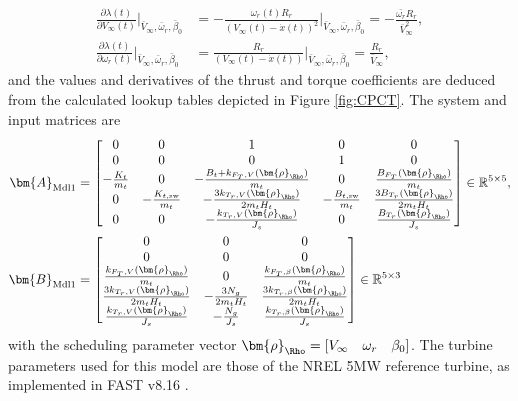 \begin{align*}
\frac{ \partial \lambda(t)}{\partial V_{\infty}(t)}\bigg|_{\bar{V}_{\infty},\bar{\omega}_r,\bar{\beta}_0} &= - \frac{\omega_r(t) R_r}{(V_{\infty}(t)-\dot{x}(t))^2}\bigg|_{\bar{V}_{\infty},\bar{\omega}_r,\bar{\beta}_0} = - \frac{\bar{\omega_r}R_r}{\bar{V}_{\infty}^2},\\
\frac{ \partial \lambda(t)}{\partial \omega_{r}(t)}\bigg|_{\bar{V}_{\infty},\bar{\omega}_r,\bar{\beta}_0} &=  \frac{ R_r}{(V_{\infty}(t)-\dot{x}(t))}\bigg|_{\bar{V}_{\infty},\bar{\omega}_r,\bar{\beta}_0} = \frac{R_r}{\bar{V}_{\infty}},
\end{align*}
and the values and derivatives of the thrust and torque coefficients are deduced from the calculated lookup tables depicted in Figure \ref{fig:CPCT}.
The system and input matrices are
\begin{align*}
\bm{A}_{\text{Mdl1}} &= \begin{bmatrix}
    0 & 0 & 1 & 0 & 0 \\
    0 & 0 & 0 & 1 & 0 \\
   - \frac{K_t}{m_t} & 0 & -\frac{B_t+ k_{F_T,V}(\bm{\rho}_{\Rho})}{m_t} & 0 & \frac{B_{F_T}(\bm{\rho}_{\Rho})}{m_t} \\
    0 &  - \frac{K_{t,\text{sw}}}{m_t}  & -\frac{3k_{T_r,V}(\bm{\rho}_{\Rho})}{2 m_t H_t} & - \frac{B_{t,\text{sw}}}{m_t} & \frac{3B_{T_r}(\bm{\rho}_{\Rho})}{2 m_t H_t} \\
    0 & 0 & - \frac{k_{T_r,V}(\bm{\rho}_{\Rho})}{J_s} & 0 & \frac{B_{T_r}(\bm{\rho}_{\Rho})}{J_s}
\end{bmatrix}  \in \mathbb{R}^{5 \times 5},\\%
\bm{B}_{\text{Mdl1}} &= \begin{bmatrix}
    0 & 0 & 0 \\
    0 & 0 & 0 \\
    \frac{k_{F_T,V}(\bm{\rho}_{\Rho})}{m_t} & 0 & \frac{k_{F_T,\beta}(\bm{\rho}_{\Rho})}{m_t} \\
    \frac{3k_{T_r,V}(\bm{\rho}_{\Rho})}{2 m_t H_t} & -\frac{3 N_g}{2 m_t H_t} &  \frac{3k_{T_r,\beta}(\bm{\rho}_{\Rho})}{2 m_t H_t}\\
      \frac{k_{T_r,V}(\bm{\rho}_{\Rho})}{J_s} & -\frac{N_g}{J_s} &  \frac{k_{T_r,\beta}(\bm{\rho}_{\Rho})}{J_s}
\end{bmatrix}  \in \mathbb{R}^{5 \times 3}\\
\end{align*} \enlargethispage{\baselineskip}
with the scheduling parameter vector $\bm{\rho}_{\Rho} = \left[V_{\infty}\quad \omega_r \quad \beta_0\right]$. The turbine parameters used for this model are those of the NREL 5MW reference turbine, as implemented in FAST v8.16 \cite{jonkman2016fast}. 
